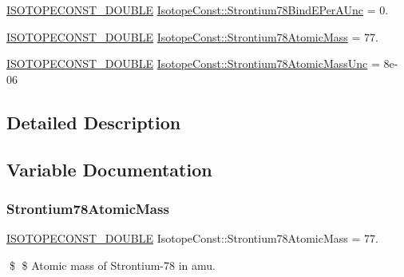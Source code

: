 \begin{DoxyCompactItemize}
\mbox{\hyperlink{group___isotope_const-_macros_ga8f45a7272ce02c0b4c65c44636ed719a}{I\+S\+O\+T\+O\+P\+E\+C\+O\+N\+S\+T\+\_\+\+D\+O\+U\+B\+LE}} \mbox{\hyperlink{group___isotope_const-_strontium-_sr78_ga6de7baa98cc5b8a5410e1cff0e28cd83}{Isotope\+Const\+::\+Strontium78\+Bind\+E\+Per\+A\+Unc}} = 0.
\item 
\mbox{\hyperlink{group___isotope_const-_macros_ga8f45a7272ce02c0b4c65c44636ed719a}{I\+S\+O\+T\+O\+P\+E\+C\+O\+N\+S\+T\+\_\+\+D\+O\+U\+B\+LE}} \mbox{\hyperlink{group___isotope_const-_strontium-_sr78_ga34840177cf92f942e0b9b307c48e1971}{Isotope\+Const\+::\+Strontium78\+Atomic\+Mass}} = 77.
\item 
\mbox{\hyperlink{group___isotope_const-_macros_ga8f45a7272ce02c0b4c65c44636ed719a}{I\+S\+O\+T\+O\+P\+E\+C\+O\+N\+S\+T\+\_\+\+D\+O\+U\+B\+LE}} \mbox{\hyperlink{group___isotope_const-_strontium-_sr78_ga228a82f9a0238412d23d3f4baa7895a3}{Isotope\+Const\+::\+Strontium78\+Atomic\+Mass\+Unc}} = 8e-\/06
\end{DoxyCompactItemize}


\subsection{Detailed Description}


\subsection{Variable Documentation}
\mbox{\label{group___isotope_const-_strontium-_sr78_ga34840177cf92f942e0b9b307c48e1971}} 
\subsubsection{\texorpdfstring{Strontium78\+Atomic\+Mass}{Strontium78AtomicMass}}
{\footnotesize\ttfamily \mbox{\hyperlink{group___isotope_const-_macros_ga8f45a7272ce02c0b4c65c44636ed719a}{I\+S\+O\+T\+O\+P\+E\+C\+O\+N\+S\+T\+\_\+\+D\+O\+U\+B\+LE}} Isotope\+Const\+::\+Strontium78\+Atomic\+Mass = 77.}

\$ \$ Atomic mass of Strontium-\/78 in amu. \mbox{\label{group___isotope_const-_strontium-_sr78_ga228a82f9a0238412d23d3f4baa7895a3}} 

